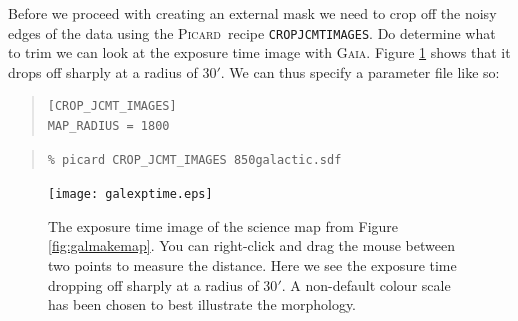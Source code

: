 \documentclass[twoside,11pt]{article}
\newcounter{box}
\newcommand{\xref}[3]{#1}
\renewcommand{\_}{\texttt{\symbol{95}}}
\newenvironment{myquote}{\begin{quote}\begin{small}}{\end{small}\end{quote}}
\newcommand{\gaia}{\xref{\textsc{Gaia}}{sun214}{}}
\newcommand{\picard}{\xref{\textsc{Picard}}{sun231}{}}
\newcommand{\drrecipe}[1]{\texttt{#1}}
\begin{document}
%
%
%



Before we proceed with creating an external mask we need to crop off the noisy edges of the data using the \picard\ recipe \drrecipe{CROP\_JCMT\_IMAGES}. Do determine what to trim we can look at the exposure time image with \gaia. Figure \ref{fig:exptime} shows that it drops off sharply at a radius of 30$'$. We can thus specify a parameter file like so:
\begin{myquote}
\begin{verbatim}
[CROP_JCMT_IMAGES]
MAP_RADIUS = 1800
\end{verbatim}
\end{myquote}

\begin{myquote}
\begin{verbatim}
% picard CROP_JCMT_IMAGES 850galactic.sdf
\end{verbatim}
\end{myquote}


\begin{figure}[th!]
\begin{center}
\texttt{[image: gal\_exptime.eps]}
\caption{\small The exposure time image of the science map from Figure \ref{fig:galmakemap}. You can right-click and drag the mouse between two points to measure the distance. Here we see the exposure time dropping off sharply at a radius of 30$'$. A non-default colour scale has been chosen to best illustrate the morphology.}
\label{fig:exptime}
\end{center}
\end{figure}
\end{document}
